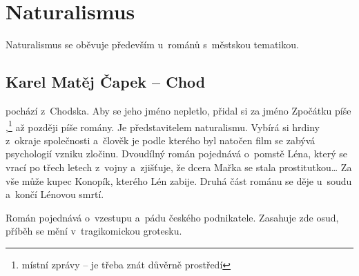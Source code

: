\section*{Naturalismus}
Naturalismus se oběvuje především u~románů s~městskou tematikou.

\subsection*{Karel Matěj Čapek -- Chod}
 pochází z~Chodska. Aby se jeho jméno nepletlo,
přidal si za jméno  Zpočátku píše
,\footnote{místní zprávy -- je třeba znát důvěrně
prostředí} až později píše romány. Je představitelem naturalismu. Vybírá
si hrdiny z~okraje společnosti a~člověk je 
 podle kterého byl natočen film 
se zabývá psychologií vzniku zločinu. Dvoudílný román pojednává o~pomstě
Léna, který se vrací po třech letech z~vojny a~zjišťuje, že dcera Mařka
se stala prostitutkou\dots{} Za vše může kupec Konopík, kterého Lén
zabije. Druhá část románu se děje u~soudu a~končí Lénovou smrtí.

Román  pojednává o~vzestupu a~pádu českého podnikatele.
Zasahuje zde osud, příběh se mění v~tragikomickou grotesku. 









